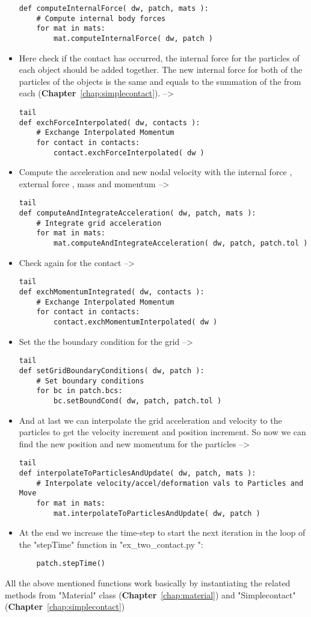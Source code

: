 \documentclass[11pt,fleqn]{book} %
\begin{document}
\begin{itemize}
\begin{lstlisting}
def computeInternalForce( dw, patch, mats ):
    # Compute internal body forces
    for mat in mats:
        mat.computeInternalForce( dw, patch )
\end{lstlisting}
\item Here check if the contact has occurred, the internal force for the particles of each object should be added together. The new internal force for both of the particles of the objects is the same and equals to the summation of the  from each (\textbf{Chapter}~\ref{chap:simplecontact}).  --> 
\begin{lstlisting}tail
def exchForceInterpolated( dw, contacts ):
    # Exchange Interpolated Momentum
    for contact in contacts:
        contact.exchForceInterpolated( dw )
\end{lstlisting}
\item Compute the acceleration and new nodal velocity with the internal force , external force , mass  and momentum  --> 
\begin{lstlisting}tail
def computeAndIntegrateAcceleration( dw, patch, mats ):
    # Integrate grid acceleration
    for mat in mats:
        mat.computeAndIntegrateAcceleration( dw, patch, patch.tol )  
\end{lstlisting}
\item Check again for the contact --> 
\begin{lstlisting}tail
def exchMomentumIntegrated( dw, contacts ):
    # Exchange Interpolated Momentum
    for contact in contacts:
        contact.exchMomentumInterpolated( dw )
\end{lstlisting}
\item Set the the boundary condition for the grid --> 
\begin{lstlisting}tail
def setGridBoundaryConditions( dw, patch ):
    # Set boundary conditions
    for bc in patch.bcs:
        bc.setBoundCond( dw, patch, patch.tol )
\end{lstlisting}
\item And at last we can interpolate the grid acceleration and velocity to the particles to get the velocity increment and position increment. So now we can find the new position and new momentum for the particles --> 
\begin{lstlisting}tail
def interpolateToParticlesAndUpdate( dw, patch, mats ):
    # Interpolate velocity/accel/deformation vals to Particles and Move
    for mat in mats:
        mat.interpolateToParticlesAndUpdate( dw, patch )
\end{lstlisting}
\item At the end we increase the time-step to start the next iteration in the  loop of the "stepTime" function in "ex\_two\_contact.py ":
\begin{lstlisting}	
	patch.stepTime() 
\end{lstlisting}
\end{itemize}

All the above mentioned functions work basically by instantiating the related methods from "Material" class (\textbf{Chapter}~\ref{chap:material}) and "Simplecontact" (\textbf{Chapter}~\ref{chap:simplecontact})
 
\end{document}
